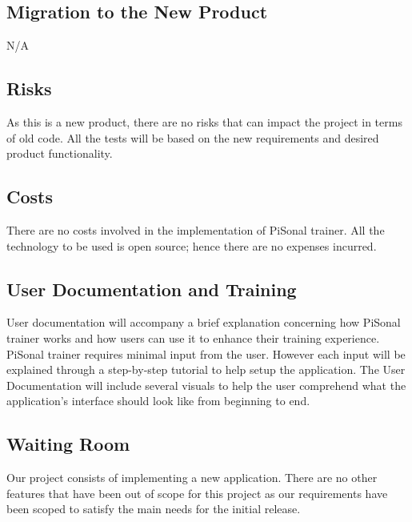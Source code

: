\documentclass{article}
\begin{document}
\subsection{Migration to the New Product}
N/A

\subsection{Risks}
As this is a new product, there are no risks that can impact the project in terms of old code. All the tests will be based on the new requirements and desired  product functionality.

\subsection{Costs}
There are no costs involved in the implementation of PiSonal trainer. All the technology to be used is open source; hence there are no expenses incurred.

\subsection{User Documentation and Training}
User documentation will accompany a brief explanation concerning how PiSonal trainer works and how users can use it to enhance their training experience. PiSonal trainer requires minimal input from the user. However each input will be explained through a step-by-step tutorial to help setup the application. The User Documentation will include several visuals to help the user comprehend what the application's interface should look like from beginning to end. 

\subsection{Waiting Room}
Our project consists of implementing a new application. There are no other features that have been out of scope for this project as our requirements have been scoped to satisfy the main needs for the initial release. 


\end{document}

